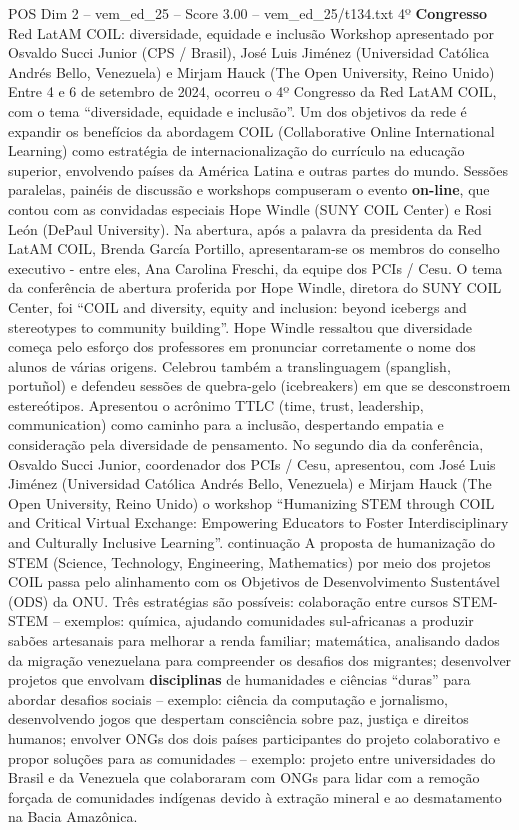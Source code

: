 \begin{textsample}{POS Dim 2 – vem\_ed\_25 – Score 3.00 – vem\_ed\_25/t134.txt}  \label{ex:f2_pos_136}
4º \textbf{Congresso} Red LatAM COIL: diversidade, equidade e inclusão Workshop apresentado por Osvaldo Succi Junior (CPS / Brasil), José Luis Jiménez (Universidad Católica Andrés Bello, Venezuela) e Mirjam Hauck (The Open University, Reino Unido) Entre 4 e 6 de setembro de 2024, ocorreu o 4º Congresso da Red LatAM COIL, com o tema “diversidade, equidade e inclusão”.
Um dos objetivos da rede é expandir os benefícios da abordagem COIL (Collaborative Online International Learning) como estratégia de internacionalização do currículo na educação superior, envolvendo países da América Latina e outras partes do mundo.
Sessões paralelas, painéis de discussão e workshops compuseram o evento \textbf{on-line}, que contou com as convidadas especiais Hope Windle (SUNY COIL Center) e Rosi León (DePaul University).
Na abertura, após a palavra da presidenta da Red LatAM COIL, Brenda García Portillo, apresentaram-se os membros do conselho executivo - entre eles, Ana Carolina Freschi, da equipe dos PCIs / Cesu.
O tema da conferência de abertura proferida por Hope Windle, diretora do SUNY COIL Center, foi “COIL and diversity, equity and inclusion: beyond icebergs and stereotypes to community building”.
Hope Windle ressaltou que diversidade começa pelo esforço dos professores em pronunciar corretamente o nome dos alunos de várias origens.
Celebrou também a translinguagem (spanglish, portuñol) e defendeu sessões de quebra-gelo (icebreakers) em que se desconstroem estereótipos.
Apresentou o acrônimo TTLC (time, trust, leadership, communication) como caminho para a inclusão, despertando empatia e consideração pela diversidade de pensamento.
No segundo dia da conferência, Osvaldo Succi Junior, coordenador dos PCIs / Cesu, apresentou, com José Luis Jiménez (Universidad Católica Andrés Bello, Venezuela) e Mirjam Hauck (The Open University, Reino Unido) o workshop “Humanizing STEM through COIL and Critical Virtual Exchange: Empowering Educators to Foster Interdisciplinary and Culturally Inclusive Learning”. continuação A proposta de humanização do STEM (Science, Technology, Engineering, Mathematics) por meio dos projetos COIL passa pelo alinhamento com os Objetivos de Desenvolvimento Sustentável (ODS) da ONU.
Três estratégias são possíveis: colaboração entre cursos STEM-STEM – exemplos: química, ajudando comunidades sul-africanas a produzir sabões artesanais para melhorar a renda familiar; matemática, analisando dados da migração venezuelana para compreender os desafios dos migrantes; desenvolver projetos que envolvam \textbf{disciplinas} de humanidades e ciências “duras” para abordar desafios sociais – exemplo: ciência da computação e jornalismo, desenvolvendo jogos que despertam consciência sobre paz, justiça e direitos humanos; envolver ONGs dos dois países participantes do projeto colaborativo e propor soluções para as comunidades – exemplo: projeto entre universidades do Brasil e da Venezuela que colaboraram com ONGs para lidar com a remoção forçada de comunidades indígenas devido à extração mineral e ao desmatamento na Bacia Amazônica.

\end{textsample}
